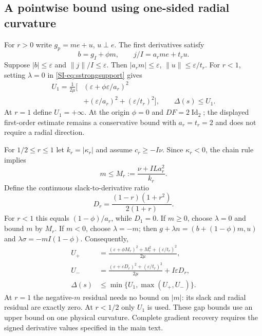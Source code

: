 \subsection{A pointwise bound using one-sided radial curvature}
For $r>0$ write $g_p=me+u$, $u\perp e$. The first derivatives satisfy
\begin{equation}
 b=g_I+\phi m,\qquad j/I=a_rm e+t_ru.
 \label{SI-eq:sstopdecomposition}
\end{equation}
Suppose $|b|\le\varepsilon$ and $\|j\|/I\le\varepsilon$. Then $|a_rm|\le\varepsilon$, $\|u\|\le\varepsilon/t_r$. For $r<1$, setting $\lambda=0$ in \eqref{SI-eq:sstrongsupport} gives
\begin{equation}
 \begin{aligned}
 U_1=\frac1{2\mu}\bigl[&(\varepsilon+\phi\varepsilon/a_r)^2\\
              &+(\varepsilon/a_r)^2+(\varepsilon/t_r)^2\bigr],\qquad
 \Delta(s)\le U_1.
 \end{aligned}
 \label{SI-eq:sstopfirst}
\end{equation}
At $r=1$ define $U_1=+\infty$. At the origin $\phi=0$ and $DF=2\operatorname{Id}_2$; the displayed first-order estimate remains a conservative bound with $a_r=t_r=2$ and does not require a radial direction.

For $1/2\le r\le1$ let $k_r=|\kappa_r|$ and assume $c_r\ge-I\nu$. Since $\kappa_r<0$, the chain rule implies
\begin{equation}
 m\le M_r:=\frac{\nu+ILa_r^2}{k_r}.
 \label{SI-eq:sstopmplus}
\end{equation}
Define the continuous slack-to-derivative ratio
\begin{equation}
 D_r=\frac{(1-r)(1+r^2)}{2(1+r)}.
 \label{SI-eq:sstopD}
\end{equation}
For $r<1$ this equals $(1-\phi)/a_r$, while $D_1=0$. If $m\ge0$, choose $\lambda=0$ and bound $m$ by $M_r$. If $m<0$, choose $\lambda=-m$; then $g+\lambda n=(b+(1-\phi)m,u)$ and $\lambda\sigma=-mI(1-\phi)$. Consequently,
\begin{equation}
 \begin{aligned}
 U_+&=\frac{(\varepsilon+\phi M_r)^2+M_r^2+(\varepsilon/t_r)^2}{2\mu},\\
 U_-&=\frac{(\varepsilon+\varepsilon D_r)^2+(\varepsilon/t_r)^2}{2\mu}
             +I\varepsilon D_r,\\
 \Delta(s)&\le\min\{U_1,\max(U_+,U_-)\}.
 \end{aligned}
 \label{SI-eq:sstoplocal}
\end{equation}
At $r=1$ the negative-$m$ residual needs no bound on $|m|$: its slack and radial residual are exactly zero. At $r<1/2$ only $U_1$ is used. These gap bounds use an upper bound on one physical curvature. Complete gradient recovery requires the signed derivative values specified in the main text.

